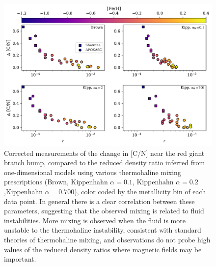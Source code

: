 \begin{figure}[!tb]
\begin{center}
\includegraphics[width=\textwidth]{./figures/mixing_vs_r/mixing_vs_r.pdf}%
\caption{Corrected measurements of the change in [C/N] near the red giant branch bump, compared to the reduced density ratio inferred from one-dimensional models using various thermohaline mixing prescriptions (Brown, Kippenhahn $\alpha=0.1$, Kippenhahn $\alpha=0.2$,Kippenhahn $\alpha=0.700$), color coded by the metallicity bin of each data point. In general there is a clear correlation between these parameters, suggesting that the observed mixing is related to fluid instabilities. More mixing is observed when the fluid is more unstable to the thermohaline instability, consistent with standard theories of thermohaline mixing, and observations do not probe high values of the reduced density ratios where magnetic fields may be important.
\label{Fig:punchline}
}
\end{center}
\end{figure}

